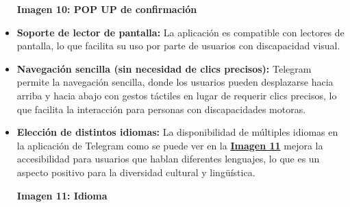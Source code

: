 \documentclass[a4paper]{article}
\newcommand{\idiomaTelegram}{idiomaTelegram.jpg}
\newcommand{\asegurarTelegram}{asegurarTelegram.jpg}
\begin{document}
\begin{itemize}
        \begin{center}
            \vspace{0.2cm}\par
            \textbf{Imagen 10: POP UP de confirmación\label{fig:imagen-telegram-deshacer}}
        \end{center}\vspace{0.1cm}

        
        \item \textbf{Soporte de lector de pantalla:} La aplicación es compatible con lectores de pantalla, lo que facilita su uso por parte de usuarios con discapacidad visual.
        
        \item \textbf{Navegación sencilla (sin necesidad de clics precisos):} Telegram permite la navegación sencilla, donde los usuarios pueden desplazarse hacia arriba y hacia abajo con gestos táctiles en lugar de requerir clics precisos, lo que facilita la interacción para personas con discapacidades motoras.
        
        \item \textbf{Elección de distintos idiomas:} La disponibilidad de múltiples idiomas en la aplicación de Telegram como se puede ver en la  \textbf{\hyperref[fig:imagen-idioma-telegram]{Imagen 11}} mejora la accesibilidad para usuarios que hablan diferentes lenguajes, lo que es un aspecto positivo para la diversidad cultural y lingüística.

        \begin{center}
            \vspace{0.2cm}\par
            \textbf{Imagen 11: Idioma\label{fig:imagen-idioma-telegram}}
        \end{center}\vspace{0.1cm}
    \end{itemize}

    
\end{document}
